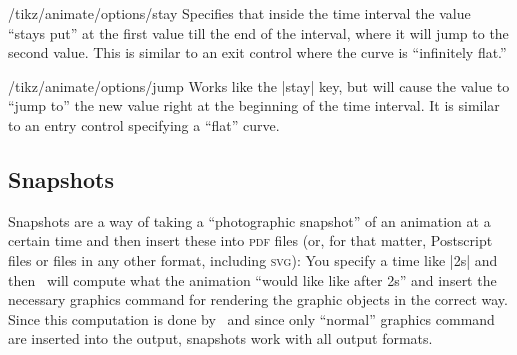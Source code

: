 \begin{key}{/tikz/animate/options/stay}
  Specifies that inside the time interval the value ``stays put'' at
  the first value till the end of the interval, where it will jump
  to the second value. This is similar to an exit control where the
  curve is ``infinitely flat.''
    
\begin{codeexample}[animation list={0.5,1,1.5,2,2.5}]
\end{codeexample}
\end{key}
  
\begin{key}{/tikz/animate/options/jump}
  Works like the |stay| key, but will cause the value to ``jump to''
  the new value right at the beginning of the time interval. It is
  similar to an entry control specifying a ``flat'' curve.

\begin{codeexample}[animation list={0.5,1,1.5,2,2.5}]
\end{codeexample}
\end{key}



\subsection{Snapshots}

\label{section-anim-snap}

Snapshots are a way of taking a ``photographic snapshot'' of an
animation at a certain time and then insert these into \textsc{pdf}
files (or, for that matter, Postscript files or files in any other
format, including \textsc{svg}): You 
specify a time like |2s| and then \tikzname\ will compute what the
animation ``would like like after 2s'' and insert the necessary
graphics command for rendering the graphic objects in the correct
way. Since this computation is done by \tikzname\ and since only
``normal'' graphics command are inserted into the output, snapshots
work with all output formats.

